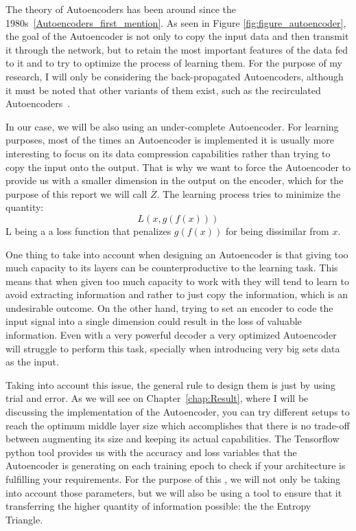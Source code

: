 The theory of Autoencoders has been around since the 1980s~\ref{Autoencoders_first_mention}. As seen in Figure \ref{fig:figure_autoencoder}, the goal of the Autoencoder is not only to copy the input data and then transmit it through the network, but to retain the most important features of the data fed to it and to try to optimize the process of learning them. For the purpose of my research, I will only be considering the back-propagated Autoencoders, although it must be noted that other variants of them exist, such as the recirculated Autoencoders~\cite{citation}. \par

In our case, we will be also using an under-complete Autoencoder. For learning purposes, most of the times an Autoencoder is implemented it is usually more interesting to focus on its data compression capabilities rather than trying to copy the input onto the output. That is why we want to force the Autoencoder to provide us with a smaller dimension in the output on the encoder, which for the purpose of this report we will call $\overline Z$. The learning process tries to minimize the quantity: 
%
\begin{equation}
L(x,g(f(x)))
\end{equation}
L being a a loss function that penalizes $g(f(x))$ for being dissimilar from $x$.

One thing to take into account when designing an Autoencoder is that giving too much capacity to its layers can be counterproductive to the learning task. This means that when given too much capacity to work with they will tend to learn to avoid extracting information and rather to just copy the information, which is an undesirable outcome. On the other hand, trying to set an encoder to code the input signal into a single dimension could result in the loss of valuable information. Even with a very powerful decoder a very optimized Autoencoder will struggle to perform this task, specially when introducing very big sets data as the input. \par

Taking into account this issue, the general rule to design them is just by using trial and error. As we will see on Chapter~\ref{chap:Result}, where I will be discussing the implementation of the Autoencoder, you can try different setups to reach the optimum middle layer size which accomplishes that there is no trade-off between augmenting its size and keeping its actual capabilities. The Tensorflow python tool provides us with the accuracy and loss variables that the Autoencoder is generating on each training epoch to check if your architecture is fulfilling your requirements. For the purpose of this \bth, we will not only be taking into account those parameters, but we will also be using a tool to ensure that it transferring the higher quantity of information possible: the {the Entropy Triangle}.

